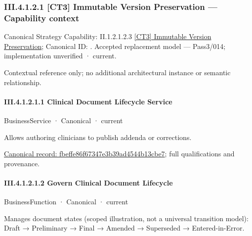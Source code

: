 \subsubsection*{III.4.1.2.1 [CT3] Immutable Version Preservation — Capability context}
\label{navigation:III.4.1.2.1}

{\small Canonical Strategy Capability: II.1.2.1.2.3 \hyperref[element:60fa9a38aa664154ad85f5eb6d681e1d]{[CT3] Immutable Version Preservation}; Canonical ID: \texttt{}. Accepted replacement model — Pass3/014; implementation unverified · current.}\par
Contextual reference only; no additional architectural instance or semantic relationship.\par
\paragraph*{III.4.1.2.1.1 Clinical Document Lifecycle Service}
\label{navigation:III.4.1.2.1.1}

\label{element:fbeffe86f67347e3b39ad4544b13cbe7}
{\small BusinessService · Canonical · current}\par

Allows authoring clinicians to publish addenda or corrections.


{\footnotesize \href{../../../../../../../../continuum/business/business-service/fbeffe86f67347e3b39ad4544b13cbe7.md}{Canonical record: fbeffe86f67347e3b39ad4544b13cbe7}; full qualifications and provenance.}\par
\paragraph*{III.4.1.2.1.2 Govern Clinical Document Lifecycle}
\label{navigation:III.4.1.2.1.2}

\label{element:e6d00e00eba64ef4bc41d2af8bc3b944}
{\small BusinessFunction · Canonical · current}\par

Manages document states (scoped illustration, not a universal transition model): Draft → Preliminary → Final → Amended → Superseded → Entered-in-Error.


